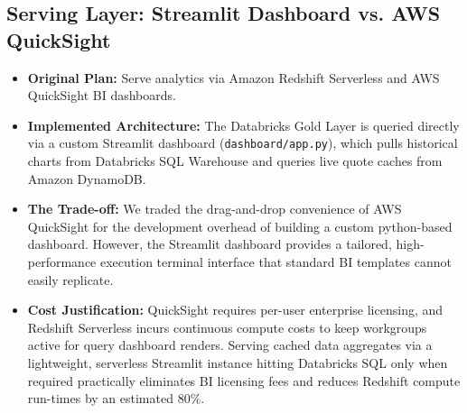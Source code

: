 \documentclass[11pt,a4paper]{article}
\begin{document}
\subsection{Serving Layer: Streamlit Dashboard vs. AWS QuickSight}
\begin{itemize}[leftmargin=*]
    \item \textbf{Original Plan:} Serve analytics via Amazon Redshift Serverless and AWS QuickSight BI dashboards.
    \item \textbf{Implemented Architecture:} The Databricks Gold Layer is queried directly via a custom Streamlit dashboard (\texttt{dashboard/app.py}), which pulls historical charts from Databricks SQL Warehouse and queries live quote caches from Amazon DynamoDB.
    \item \textbf{The Trade-off:} We traded the drag-and-drop convenience of AWS QuickSight for the development overhead of building a custom python-based dashboard. However, the Streamlit dashboard provides a tailored, high-performance execution terminal interface that standard BI templates cannot easily replicate.
    \item \textbf{Cost Justification:} QuickSight requires per-user enterprise licensing, and Redshift Serverless incurs continuous compute costs to keep workgroups active for query dashboard renders. Serving cached data aggregates via a lightweight, serverless Streamlit instance hitting Databricks SQL only when required practically eliminates BI licensing fees and reduces Redshift compute run-times by an estimated 80\%.
\end{itemize}
\end{document}
